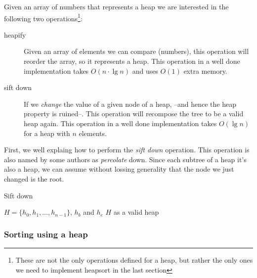 Given an array of numbers that represents a heap we are interested in the following two operations\footnote{These are not the only operations defined for a heap, but rather the only ones we need to implement heapsort in the last section}:

\begin{description}
 \item[heapify] Given an array of elements we can compare (numbers), this operation will reorder the array, so it represents a heap. This operation in a well done implementation takes $O(n \cdot \lg n)$ and uses $O(1)$ extra memory.
 \item[sift down] If we \emph{change} the value of a given node of a heap, --and hence the heap property is ruined--. This operation will recompose the tree to be a valid heap again. This operation in a well done implementation takes $O(\lg n)$ for a heap with $n$ elements.
\end{description}

First, we well explaing how to perform the \emph{sift down} operation.
This operation is also named by some authors as \emph{percolate} down.
Since each subtree of a heap it's also a heap, we can assume without lossing generality that the node we just changed is the root.

\begin{algorithm}[H]
\caption{Sift down}
\label{alg:siftdown}
\begin{algorithmic}[1] %
\Require $H = \{ h_0, h_1, \ldots, h_{n-1} \} $, $h_b$ and $h_e$ 
\Ensure $H$ as a valid heap
 

\EndProcedure
\end{algorithmic}
\end{algorithm}

\subsubsection{Sorting using a heap}
